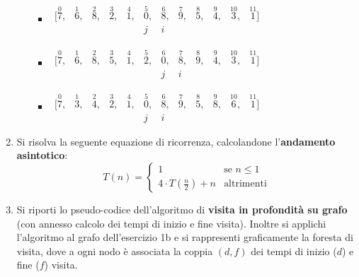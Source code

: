 \begin{enumerate}
\begin{enumerate}
\begin{itemize}
		\item $\begin{array}{cccccccccccc}
			[\stackrel{0}{7},&
			\stackrel{1}{6}, &
			\stackrel{2}{8}, &
			\stackrel{3}{2}, &
			\stackrel{4}{1}, &
			\stackrel{5}{0}, &
			\stackrel{6}{8}, &
			\stackrel{7}{9}, &
			\stackrel{8}{5}, &
			\stackrel{9}{4}, &
			\stackrel{10}{3}, &
			\stackrel{11}{1}] \\
			 & %
			 & %
			 & %
			 & %
			 & %
			 j& %
			 i& %
			 & %
			 & %
			 & %
			 & %
		\end{array}$
		\item $\begin{array}{cccccccccccc}
			[\stackrel{0}{7}, &
			\stackrel{1}{6}, &
			\stackrel{2}{8}, &
			\stackrel{3}{5}, &
			\stackrel{4}{1}, &
			\stackrel{5}{2}, &
			\stackrel{6}{0}, &
			\stackrel{7}{8}, &
			\stackrel{8}{9}, &
			\stackrel{9}{4}, &
			\stackrel{10}{3}, &
			\stackrel{11}{1}] \\
			  & %
			  & %
			  & %
			  & %
			  & %
			  & %
			  j& %
			  i& %
			  & %
			  & %
			  & %
		 \end{array}$
		\item $\begin{array}{cccccccccccc}
			[\stackrel{0}{7}, &
			\stackrel{1}{3}, &
			\stackrel{2}{4}, &
			\stackrel{3}{2}, &
			\stackrel{4}{1}, &
			\stackrel{5}{0}, &
			\stackrel{6}{8}, &
			\stackrel{7}{9}, &
			\stackrel{8}{5}, &
			\stackrel{9}{8}, &
			\stackrel{10}{6}, &
			\stackrel{11}{1}] \\
			  & %
			  & %
			  & %
			  & %
			  & %
			  j& %
			  i& %
			  & %
			  & %
			  & %
			  & %
		 \end{array}$
	\end{itemize}
\end{enumerate}
\item Si risolva la seguente equazione di ricorrenza, calcolandone l'\textbf{andamento asintotico}:
\begin{displaymath}
	T(n) = \begin{cases}
		1 & \text{se $n \leq 1$} \\
		4 \cdot T(\frac{n}{2})+n & \text{altrimenti}
	\end{cases}
\end{displaymath}
\item Si riporti lo pseudo-codice dell'algoritmo di \textbf{visita in profondità su grafo} (con annesso calcolo dei tempi di inizio e fine visita). Inoltre si applichi l'algoritmo al grafo dell'esercizio 1b e si rappresenti graficamente la foresta di visita, dove a ogni nodo è associata la coppia $(d,f)$ dei tempi di inizio ($d$) e fine ($f$) visita.

\end{enumerate}
